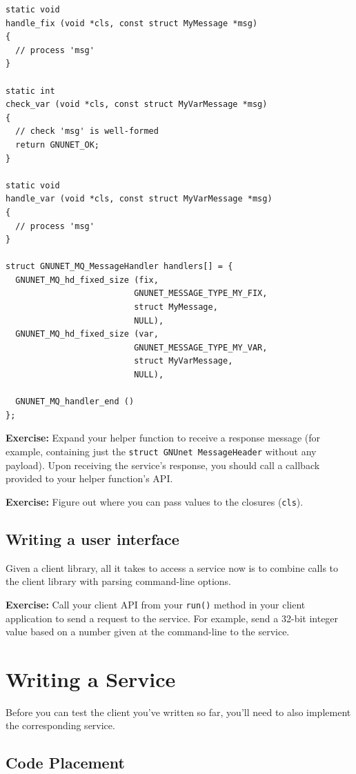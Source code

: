 \documentclass[10pt]{article}
\newcommand{\exercise}[1]{\noindent\begin{boxedminipage}{\textwidth}{\bf Exercise:} #1 \end{boxedminipage}}
\begin{document}
\lstset{language=c}
\begin{lstlisting}
static void
handle_fix (void *cls, const struct MyMessage *msg)
{
  // process 'msg'
}

static int
check_var (void *cls, const struct MyVarMessage *msg)
{
  // check 'msg' is well-formed
  return GNUNET_OK;
}

static void
handle_var (void *cls, const struct MyVarMessage *msg)
{
  // process 'msg'
}

struct GNUNET_MQ_MessageHandler handlers[] = {
  GNUNET_MQ_hd_fixed_size (fix,
                          GNUNET_MESSAGE_TYPE_MY_FIX,
                          struct MyMessage,
                          NULL),
  GNUNET_MQ_hd_fixed_size (var,
                          GNUNET_MESSAGE_TYPE_MY_VAR,
                          struct MyVarMessage,
                          NULL),

  GNUNET_MQ_handler_end ()
};
\end{lstlisting}

\exercise{Expand your helper function to receive a response message
  (for example, containing just the {\tt struct GNUnet MessageHeader}
  without any payload).  Upon receiving the service's response, you
  should call a callback provided to your helper function's API.}

\exercise{Figure out where you can pass values to the closures ({\tt cls}).}


\subsection{Writing a user interface}

Given a client library, all it takes to access a service now is to
combine calls to the client library with parsing command-line
options.

\exercise{Call your client API from your {\tt run()} method in your
  client application to send a request to the service.  For example,
  send a 32-bit integer value based on a number given at the
  command-line to the service.}



\section{Writing a Service}

Before you can test the client you've written so far, you'll need to also
implement the corresponding service.


\subsection{Code Placement}
\end{document}
